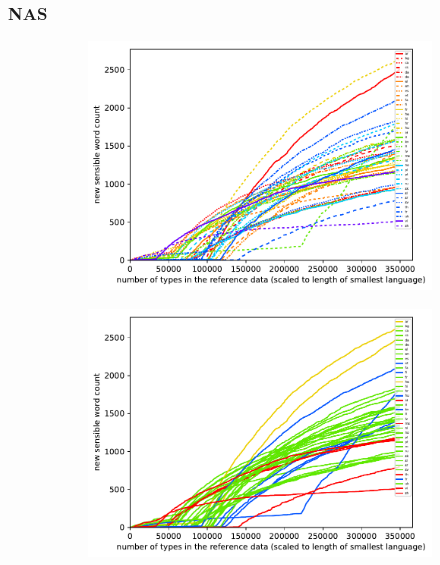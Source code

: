\documentclass[11pt,a4paper,twoside,openright]{scrbook}
\begin{document}
\subsubsection{NAS}
\begin{figure}[h]
    \centering
    \begin{subfigure}[b]{0.32\textwidth}
    	\centering
        \includegraphics[width=\textwidth]{graphs/nas/norm_huge_type_type_performance}
    \end{subfigure}
    \begin{subfigure}[b]{0.32\textwidth}
    	\centering
        \includegraphics[width=\textwidth]{graphs/nas/morph_types/norm_huge_type_type_performance}
    \end{subfigure}
    \begin{subfigure}[b]{0.32\textwidth}

\end{subfigure}
\end{figure}
\end{document}
